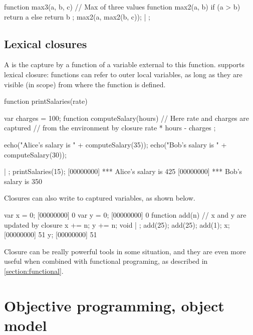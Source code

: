 \begin{urbiscript}
function max3(a, b, c) // Max of three values
{
  function max2(a, b)
  {
    if (a > b)
      return a
    else
      return b
  };
  max2(a, max2(b, c));
} | {};
\end{urbiscript}

\section{Lexical closures}

A  is the capture by a function of a variable external to this
function. \us supports lexical closure: functions can refer to outer
local variables, as long as they are visible (in scope) from where
the function is defined.

\begin{urbiscript}
function printSalaries(rate)
{
  var charges = 100;
  function computeSalary(hours)
  {
    // Here rate and charges are captured
    // from the environment by closure
    rate * hours - charges
  };

  echo("Alice's salary is " + computeSalary(35));
  echo("Bob's salary is " + computeSalary(30));
} | {};
printSalaries(15);
[00000000] *** Alice's salary is 425
[00000000] *** Bob's salary is 350
\end{urbiscript}

Closures can also write to captured variables, as shown below.

\begin{urbiscript}
var x = 0;
[00000000] 0
var y = 0;
[00000000] 0
function add(n)
{
  // x and y are updated by closure
  x += n;
  y += n;
  void
} | {};
add(25);
add(25);
add(1);
x;
[00000000] 51
y;
[00000000] 51
\end{urbiscript}

Closure can be really powerful tools in some situation, and they are
even more useful when combined with functional programing, as
described in \autoref{section:functional}.


\chapter{Objective programming, \us object model}
\label{section:objective}

